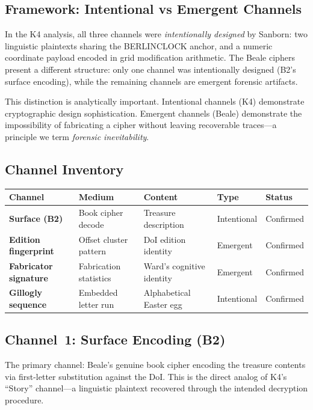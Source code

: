 \documentclass[11pt,a4paper]{article}
\begin{document}
\subsection{Framework: Intentional vs Emergent Channels}

In the K4 analysis, all three channels were \emph{intentionally designed}
by Sanborn: two linguistic plaintexts sharing the BERLINCLOCK anchor, and
a numeric coordinate payload encoded in grid modification arithmetic.
The Beale ciphers present a different structure: only one channel was
intentionally designed (B2's surface encoding), while the remaining
channels are emergent forensic artifacts.

This distinction is analytically important. Intentional channels (K4)
demonstrate cryptographic design sophistication. Emergent channels (Beale)
demonstrate the impossibility of fabricating a cipher without leaving
recoverable traces---a principle we term \emph{forensic inevitability}.

\subsection{Channel Inventory}

\begin{center}
\begin{tabular}{@{}lp{3cm}p{4.5cm}ll@{}}
\toprule
\textbf{Channel} & \textbf{Medium} & \textbf{Content} & \textbf{Type} & \textbf{Status} \\
\midrule
\textbf{Surface (B2)} & Book cipher decode & Treasure description & Intentional & Confirmed \\
\textbf{Edition fingerprint} & Offset cluster pattern & DoI edition identity & Emergent & Confirmed \\
\textbf{Fabricator signature} & Fabrication statistics & Ward's cognitive identity & Emergent & Confirmed \\
\textbf{Gillogly sequence} & Embedded letter run & Alphabetical Easter egg & Intentional & Confirmed \\
\bottomrule
\end{tabular}
\end{center}

\subsection{Channel~1: Surface Encoding (B2)}

The primary channel: Beale's genuine book cipher encoding the treasure
contents via first-letter substitution against the DoI. This is the
direct analog of K4's ``Story'' channel---a linguistic plaintext
recovered through the intended decryption procedure.
\end{document}
